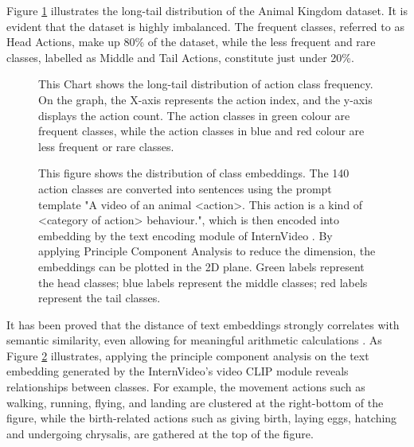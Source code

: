 Figure \ref{fig:1_1_LongTail} illustrates the long-tail distribution of the Animal Kingdom dataset. It is evident that the dataset is highly imbalanced. The frequent classes, referred to as Head Actions, make up 80\% of the dataset, while the less frequent and rare classes, labelled as Middle and Tail Actions, constitute just under 20\%.

\begin{figure}[ht]
    \centering
    \resizebox{1.0\textwidth}{!}{}
    \caption[Action Classes Frequency Distribution]{This Chart shows the long-tail distribution of action class frequency. On the graph, the X-axis represents the action index, and the y-axis displays the action count. The action classes in green colour are frequent classes, while the action classes in blue and red colour are less frequent or rare classes.}
    \label{fig:1_1_LongTail}
\end{figure}

\begin{figure}[ht]
    \centering
    \caption[Class Embedding Distribution]{This figure shows the distribution of class embeddings. The 140 action classes are converted into sentences using the prompt template "A video of an animal <action>. This action is a kind of <category of action> behaviour.", which is then encoded into embedding by the text encoding module of InternVideo \parencite{wang2022internvideo}. By applying Principle Component Analysis to reduce the dimension, the embeddings can be plotted in the 2D plane. Green labels represent the head classes; blue labels represent the middle classes; red labels represent the tail classes.}
    \label{fig:1_2_ClassEmbeddingInternVideo}
\end{figure}

It has been proved that the distance of text embeddings strongly correlates with semantic similarity, even allowing for meaningful arithmetic calculations \parencite{mikolov2013efficient}. As Figure \ref{fig:1_2_ClassEmbeddingInternVideo} illustrates, applying the principle component analysis on the text embedding generated by the InternVideo's \parencite{wang2022internvideo} video CLIP module reveals relationships between classes. For example, the movement actions such as walking, running, flying, and landing are clustered at the right-bottom of the figure, while the birth-related actions such as giving birth, laying eggs, hatching and undergoing chrysalis, are gathered at the top of the figure. 


